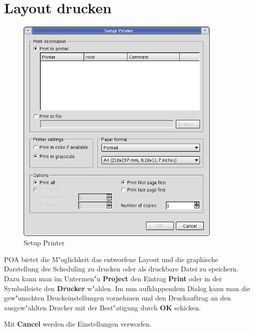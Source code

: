 \documentclass[a4paper,titlepage,12pt,ngerman]{scrbook}
\begin{document}
\section{Layout drucken}
\begin{figure}[htbp]

\begin{center}

\includegraphics[width=10cm]{Printer}

\caption{Setup Printer}\label{test}

\end{center}

\end{figure}
POA bietet die M"oglichkeit das entworfene Layout und die graphische Darstellung des Scheduling zu drucken oder als druckbare Datei zu speichern.
Dazu kann man im Untermen"u {\bf Project} den Eintrag {\bf Print} oder in der Symbolleiste den {\bf Drucker} w"ahlen. Im nun aufklappendem Dialog kann man die gew"unschten Druckeinstellungen vornehmen und den Druckauftrag an den ausgew"ahlten Drucker mit der Best"atigung durch {\bf OK} schicken.\par
Mit {\bf Cancel} werden die Einstellungen verworfen.\par






\newpage
\end{document}
